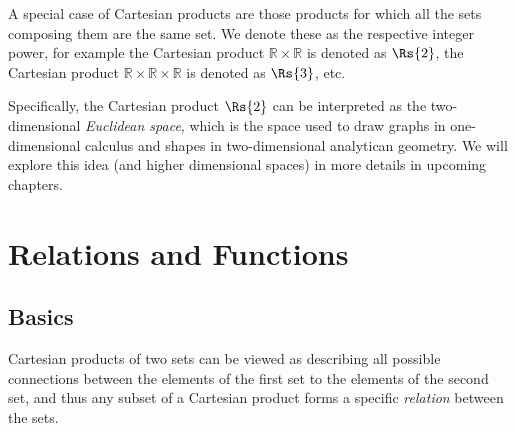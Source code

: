 A special case of Cartesian products are those products for which all the sets composing them are the same set. We denote these as the respective integer power, for example the Cartesian product $\mathbb{R}\times\mathbb{R}$ is denoted as $\Rs{2}$, the Cartesian product $\mathbb{R}\times\mathbb{R}\times\mathbb{R}$ is denoted as $\Rs{3}$, etc.

Specifically, the Cartesian product $\Rs{2}$ can be interpreted as the two-dimensional \emph{Euclidean space}, which is the space used to draw graphs in one-dimensional calculus and shapes in two-dimensional analytican geometry. We will explore this idea (and higher dimensional spaces) in more details in upcoming chapters.

\section{Relations and Functions}
\subsection{Basics}
Cartesian products of two sets can be viewed as describing all possible connections between the elements of the first set to the elements of the second set, and thus any subset of a Cartesian product forms a specific \emph{relation} between the sets.

